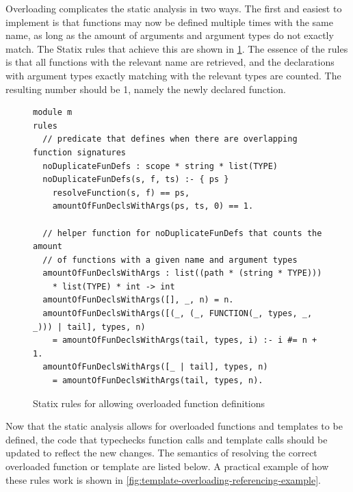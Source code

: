     Overloading complicates the static analysis in two ways. The first and easiest to implement is that functions may now be defined multiple times with the same name, as long as the amount of arguments and argument types do not exactly match. The Statix rules that achieve this are shown in \cref{fig:statix-overloaded-function-definitions}. The essence of the rules is that all functions with the relevant name are retrieved, and the declarations with argument types exactly matching with the relevant types are counted. The resulting number should be 1, namely the newly declared function.

    \begin{figure}
      \begin{verbatim}
module m
rules
  // predicate that defines when there are overlapping function signatures
  noDuplicateFunDefs : scope * string * list(TYPE)
  noDuplicateFunDefs(s, f, ts) :- { ps }
    resolveFunction(s, f) == ps,
    amountOfFunDeclsWithArgs(ps, ts, 0) == 1.

  // helper function for noDuplicateFunDefs that counts the amount
  // of functions with a given name and argument types
  amountOfFunDeclsWithArgs : list((path * (string * TYPE))) 
    * list(TYPE) * int -> int
  amountOfFunDeclsWithArgs([], _, n) = n.
  amountOfFunDeclsWithArgs([(_, (_, FUNCTION(_, types, _, _))) | tail], types, n)
    = amountOfFunDeclsWithArgs(tail, types, i) :- i #= n + 1.
  amountOfFunDeclsWithArgs([_ | tail], types, n)
    = amountOfFunDeclsWithArgs(tail, types, n).
      \end{verbatim}
      \caption{\label{fig:statix-overloaded-function-definitions}Statix rules for allowing overloaded function definitions}
    \end{figure}

    Now that the static analysis allows for overloaded functions and templates to be defined, the code that typechecks function calls and template calls should be updated to reflect the new changes. The semantics of resolving the correct overloaded function or template are listed below. A practical example of how these rules work is shown in \cref{fig:template-overloading-referencing-example}.

